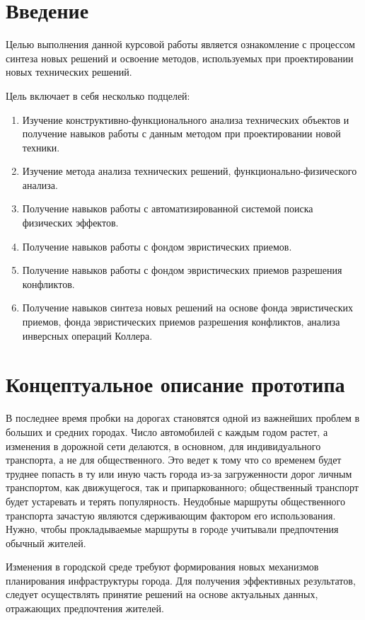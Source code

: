 \chapter{Введение}
Целью выполнения данной курсовой работы является ознакомление с процессом
синтеза новых решений и освоение методов, используемых при проектировании новых
технических решений.

Цель включает в себя несколько подцелей:
\begin{enumerate}
  \item Изучение конструктивно-функционального анализа технических объектов и
    получение навыков работы с данным методом при проектировании новой техники.
  \item Изучение метода анализа технических решений, функционально-физи\-ческого
    анализа. 
  \item Получение навыков работы с автоматизированной системой поиска
    физических эффектов.
  \item Получение навыков работы с фондом эвристических приемов.
  \item Получение навыков работы с фондом эвристических приемов разрешения
    конфликтов.
  \item Получение навыков синтеза новых решений на основе фонда эвристических
    приемов, фонда эвристических приемов разрешения конфликтов, анализа
    инверсных операций Коллера.
\end{enumerate}

\chapter{Концептуальное описание прототипа}
В последнее время пробки на дорогах становятся одной из важнейших проблем в
больших и средних городах. Число автомобилей с каждым годом растет, а изменения
в дорожной сети делаются, в основном, для индивидуального транспорта, а не
для общественного. Это ведет к тому что со временем будет труднее попасть в ту
или иную часть города из-за загруженности дорог личным транспортом, как
движущегося, так и припаркованного; общественный транспорт будет устаревать и
терять популярность. Неудобные маршруты общественного транспорта зачастую
являются сдерживающим фактором его использования. Нужно, чтобы прокладываемые
маршруты в городе учитывали предпочтения обычный жителей. 

Изменения в городской среде требуют формирования новых механизмов планирования
инфраструктуры города. Для получения эффективных результатов, следует
осуществлять принятие решений на основе актуальных данных, отражающих
предпочтения жителей.

